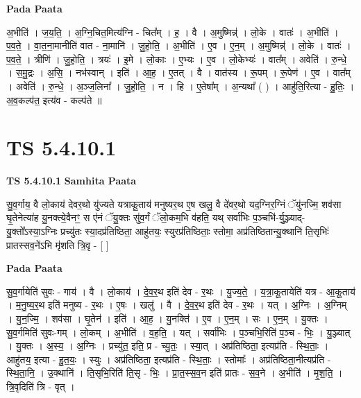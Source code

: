 \documentclass[17pt]{extarticle}
\begin{document}
\textbf{Pada Paata} \newline

अ॒भीति॑ । ज॒य॒ति॒ । अ॒ग्नि॒चित॒मित्य॑ग्नि - चित᳚म् । ह॒ । वै । अ॒मुष्मिन्न्॑ । लो॒के । वातः॑ । अ॒भीति॑ । प॒व॒ते॒ । वा॒त॒ना॒मानीति॑ वात - ना॒मानि॑ । जु॒हो॒ति॒ । अ॒भीति॑ । ए॒व । ए॒न॒म् । अ॒मुष्मिन्न्॑ । लो॒के । वातः॑ । प॒व॒ते॒ । त्रीणि॑ । जु॒हो॒ति॒ । त्रयः॑ । इ॒मे । लो॒काः । ए॒भ्यः । ए॒व । लो॒केभ्यः॑ । वात᳚म् । अवेति॑ । रु॒न्धे॒ । स॒मु॒द्रः । अ॒सि॒ । नभ॑स्वान् । इति॑ । आ॒ह॒ । ए॒तत् । वै । वात॑स्य । रू॒पम् । रू॒पेण॑ । ए॒व । वात᳚म् । अवेति॑ । रु॒न्धे॒ । अ॒ञ्ज॒लिना᳚ । जु॒हो॒ति॒ । न । हि । ए॒तेषा᳚म् । अ॒न्यथा᳚ ( ) । आहु॑ति॒रित्या - हु॒तिः॒ । अ॒व॒कल्प॑त॒ इत्य॑व - कल्प॑ते ॥  \newline




\section*{ TS 5.4.10.1 }

\textbf{TS 5.4.10.1 } \newline
\textbf{Samhita Paata} \newline

सु॒व॒र्गाय॒ वै लो॒काय॑ देवर॒थो यु॑ज्यते यत्राकू॒ताय॑ मनुष्यर॒थ ए॒ष खलु॒ वै दे॑वर॒थो यद॒ग्निर॒ग्निं ॅयु॑नज्मि॒ शव॑सा घृ॒तेनेत्या॑ह यु॒नक्त्ये॒वैनꣳ॒॒ स ए॑नं ॅयु॒क्तः सु॑व॒र्गं ॅलो॒कम॒भि व॑हति॒ यथ् सर्वा॑भिः प॒ञ्चभि॑-र्यु॒ञ्ज्याद्-यु॒क्तो᳚ऽस्या॒ऽग्निः प्रच्यु॑तः स्या॒दप्र॑तिष्ठिता॒ आहु॑तयः॒ स्युरप्र॑तिष्ठिताः॒ स्तोमा॒ अप्र॑तिष्ठितान्यु॒क्थानि॑ ति॒सृभिः॑ प्रातस्सव॒ने॑ऽभि मृ॑शति त्रि॒वृ - [  ] \newline

\textbf{Pada Paata} \newline

सु॒व॒र्गायेति॑ सुवः - गाय॑ । वै । लो॒काय॑ । दे॒व॒र॒थ इति॑ देव - र॒थः । यु॒ज्य॒ते॒ । य॒त्रा॒कू॒तायेति॑ यत्र - आ॒कू॒ताय॑ । म॒नु॒ष्य॒र॒थ इति॑ मनुष्य - र॒थः । ए॒षः । खलु॑ । वै । दे॒व॒र॒थ इति॑ देव - र॒थः । यत् । अ॒ग्निः । अ॒ग्निम् । यु॒न॒ज्मि॒ । शव॑सा । घृ॒तेन॑ । इति॑ । आ॒ह॒ । यु॒नक्ति॑ । ए॒व । ए॒न॒म् । सः । ए॒न॒म् । यु॒क्तः । सु॒व॒र्गमिति॑ सुवः-गम् । लो॒कम् । अ॒भीति॑ । व॒ह॒ति॒ । यत् । सर्वा॑भिः । प॒ञ्चभि॒रिति॑ प॒ञ्च - भिः॒ । यु॒ञ्ज्यात् । यु॒क्तः । अ॒स्य॒ । अ॒ग्निः । प्रच्यु॑त॒ इति॒ प्र - च्यु॒तः॒ । स्या॒त् । अप्र॑तिष्ठिता॒ इत्यप्र॑ति - स्थि॒ताः॒ । आहु॑तय॒ इत्या - हु॒त॒यः॒ । स्युः । अप्र॑तिष्ठिता॒ इत्यप्र॑ति - स्थि॒ताः॒ । स्तोमाः᳚ । अप्र॑तिष्ठिता॒नीत्यप्र॑ति - स्थि॒ता॒नि॒ । उ॒क्थानि॑ । ति॒सृभि॒रिति॑ ति॒सृ - भिः॒ । प्रा॒त॒स्स॒व॒न इति॑ प्रातः - स॒व॒ने । अ॒भीति॑ । मृ॒श॒ति॒ । त्रि॒वृदिति॑ त्रि - वृत् ।  \newline
\end{document}
